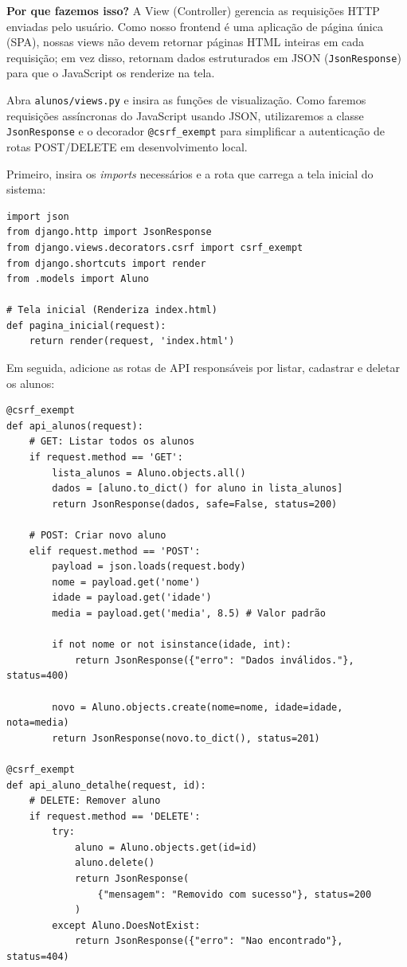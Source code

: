 \documentclass[12pt,a4paper]{article}
\begin{document}
\begin{boxAtividade}
\textbf{Por que fazemos isso?} A View (Controller) gerencia as requisições HTTP enviadas pelo usuário. Como nosso frontend é uma aplicação de página única (SPA), nossas views não devem retornar páginas HTML inteiras em cada requisição; em vez disso, retornam dados estruturados em JSON (\texttt{JsonResponse}) para que o JavaScript os renderize na tela.

Abra \texttt{alunos/views.py} e insira as funções de visualização. Como faremos requisições assíncronas do JavaScript usando JSON, utilizaremos a classe \texttt{JsonResponse} e o decorador \texttt{@csrf\_exempt} para simplificar a autenticação de rotas POST/DELETE em desenvolvimento local.

Primeiro, insira os \textit{imports} necessários e a rota que carrega a tela inicial do sistema:
\begin{boxCodigo}
\begin{verbatim}
import json
from django.http import JsonResponse
from django.views.decorators.csrf import csrf_exempt
from django.shortcuts import render
from .models import Aluno

# Tela inicial (Renderiza index.html)
def pagina_inicial(request):
    return render(request, 'index.html')
\end{verbatim}
\end{boxCodigo}

\vspace{0.3cm}
Em seguida, adicione as rotas de API responsáveis por listar, cadastrar e deletar os alunos:
\begin{boxCodigo}
\begin{verbatim}
@csrf_exempt
def api_alunos(request):
    # GET: Listar todos os alunos
    if request.method == 'GET':
        lista_alunos = Aluno.objects.all()
        dados = [aluno.to_dict() for aluno in lista_alunos]
        return JsonResponse(dados, safe=False, status=200)

    # POST: Criar novo aluno
    elif request.method == 'POST':
        payload = json.loads(request.body)
        nome = payload.get('nome')
        idade = payload.get('idade')
        media = payload.get('media', 8.5) # Valor padrão

        if not nome or not isinstance(idade, int):
            return JsonResponse({"erro": "Dados inválidos."}, status=400)

        novo = Aluno.objects.create(nome=nome, idade=idade, nota=media)
        return JsonResponse(novo.to_dict(), status=201)

@csrf_exempt
def api_aluno_detalhe(request, id):
    # DELETE: Remover aluno
    if request.method == 'DELETE':
        try:
            aluno = Aluno.objects.get(id=id)
            aluno.delete()
            return JsonResponse(
                {"mensagem": "Removido com sucesso"}, status=200
            )
        except Aluno.DoesNotExist:
            return JsonResponse({"erro": "Nao encontrado"}, status=404)
\end{verbatim}
\end{boxCodigo}
\end{boxAtividade}
\end{document}
